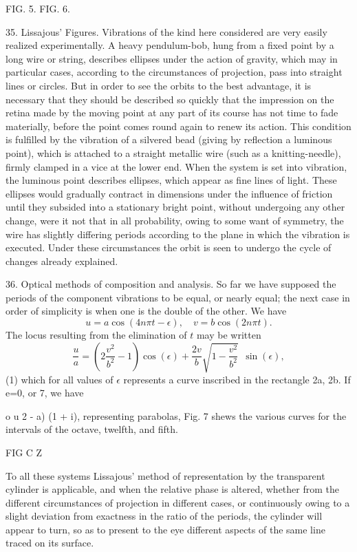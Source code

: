 FIG. 5.  FIG. 6.

35. Lissajous' Figures. Vibrations of the kind here considered are very easily
realized experimentally. A heavy pendulum-bob, hung from a fixed point by a
long wire or string, describes ellipses under the action of gravity, which may
in particular cases, according to the circumstances of projection, pass into
straight lines or circles. But in order to see the orbits to the best
advantage, it is necessary that they should be described so quickly that the
impression on the retina made by the moving point at any part of its course has
not time to fade materially, before the point comes round again to renew its
action. This condition is fulfilled by the vibration of a silvered bead (giving
by reflection a luminous point), which is attached to a straight metallic wire
(such as a knitting-needle), firmly clamped in a vice at the lower end.  When
the system is set into vibration, the luminous point describes ellipses, which
appear as fine lines of light. These ellipses would gradually contract in
dimensions under the influence of friction until they subsided into a
stationary bright point, without undergoing any other change, were it not that
in all probability, owing to some want of symmetry, the wire has slightly
differing periods according to the plane in which the vibration is executed.
Under these circumstances the orbit is seen to undergo the cycle of changes
already explained.

36. Optical methods of composition and analysis. So far we have supposed the
periods of the component vibrations to be equal, or nearly equal; the next case
in order of simplicity is when one is the double of the other. We have
\[u=a \cos(4n \pi t-\epsilon), \quad v= b \cos(2n \pi t).\]
The locus resulting from the elimination of \(t\) may be written
\[
\frac{u}{a} = \left( 2 \frac{v^2}{b^2} -1 \right) \cos (\epsilon ) +
\frac{2v}{b} \sqrt{1-\frac{v^2}{b^2}} ~~ \sin(\epsilon),
\]
(1) which for all values of \(\epsilon\) represents a curve inscribed in the
rectangle 2a, 2b.   If e=0, or
7, we have

o u 2 - a) (1 + i), representing parabolas, Fig. 7 shews the various curves for
the intervals of the octave, twelfth, and fifth.

 FIG C Z

To all these systems Lissajous' method of representation by the transparent
cylinder is applicable, and when the relative phase is altered, whether from
the different circumstances of projection in different cases, or continuously
owing to a slight deviation from exactness in the ratio of the periods, the
cylinder will appear to turn, so as to present to the eye different aspects of
the same line traced on its surface.


